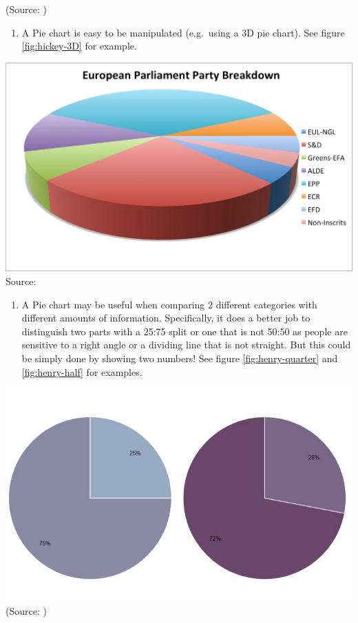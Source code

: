 \documentclass[]{book}
\providecommand{\tightlist}{%
  \setlength{\itemsep}{0pt}\setlength{\parskip}{0pt}}
\theoremstyle{definition}
\theoremstyle{definition}
\theoremstyle{definition}
\theoremstyle{remark}
\begin{document}
(Source: \citep{hickey-pie-worst})

\begin{enumerate}
\def\labelenumi{\arabic{enumi}.}
\setcounter{enumi}{2}
\tightlist
\item
  A Pie chart is easy to be manipulated (e.g.~using a 3D pie chart). See
  figure \ref{fig:hickey-3D} for example.
\end{enumerate}

\includegraphics{images/hickey-3D.jpg} Source: \citep{hickey-pie-worst}

\begin{enumerate}
\def\labelenumi{\arabic{enumi}.}
\setcounter{enumi}{3}
\tightlist
\item
  A Pie chart may be useful when comparing 2 different categories with
  different amounts of information. Specifically, it does a better job
  to distinguish two parts with a 25:75 split or one that is not 50:50
  as people are sensitive to a right angle or a dividing line that is
  not straight. But this could be simply done by showing two numbers!
  See figure \ref{fig:henry-quarter} and \ref{fig:henry-half} for
  examples.
\end{enumerate}

\includegraphics{images/henry-quarter.png} (Source:
\citep{henry-defense-pie})
\end{document}
